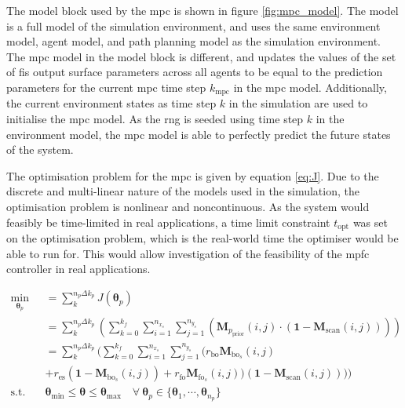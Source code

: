 \documentclass[conference]{IEEEtran}
\begin{document}
The model block used by the \gls{mpc} is shown in figure \ref{fig:mpc_model}.
The model is a full model of the simulation environment, and uses the same environment model, agent model, and path planning model as the simulation environment.
The \gls{mpc} model in the model block is different, and updates the values of the set of \gls{fis} output surface parameters across all agents to be equal to the prediction parameters for the current \gls{mpc} time step $k_{\text{mpc}}$ in the \gls{mpc} model.
Additionally, the current environment states as time step $k$ in the simulation are used to initialise the \gls{mpc} model.
As the \gls{rng} is seeded using time step $k$ in the environment model, the \gls{mpc} model is able to perfectly predict the future states of the system.

\begin{figure*}
    \centering
    
    \caption{\gls{mpc} model block diagram}
    \label{fig:mpc_model}
\end{figure*}

The optimisation problem for the \gls{mpc} is given by equation \ref{eq:J}.
Due to the discrete and multi-linear nature of the models used in the simulation, the optimisation problem is nonlinear and noncontinuous.
As the system would feasibly be time-limited in real applications, a time limit constraint $t_{\text{opt}}$ was set on the optimisation problem, which is the real-world time the optimiser would be able to run for.
This would allow investigation of the feasibility of the \gls{mpfc} controller in real applications.

\begin{equation} \label{eq:J}
    \begin{aligned}
        \min_{\bm{\theta}_{p}} 
        &= \sum_{k}^{n_{p} \Delta k_{p}} J (\bm{\theta}_{p})\\
        &= \sum_{k}^{n_{p} \Delta k_{p}} ( \sum_{k=0}^{k_{f}} \sum_{i=1}^{n_{x_{s}}} \sum_{j=1}^{n_{y_{s}}} ( \bm{M}_{p_{\text{prior}}}(i,j) \cdot (\bm{1} - \bm{M}_{\text{scan}}(i,j))) ) \\
        &= \sum_{k}^{n_{p} \Delta k_{p}} ( \sum_{k=0}^{k_{f}} \sum_{i=1}^{n_{x_{s}}} \sum_{j=1}^{n_{y_{s}}} ( r_{\text{bo}} \bm{M}_{\text{bo}_{s}}(i,j) \\
        & + r_{\text{es}} (\bm{1} - \bm{M}_{\text{bo}_{s}}(i,j)) + r_{\text{fo}} \bm{M}_{\text{fo}_{s}}(i,j)) (\bm{1} - \bm{M}_{\text{scan}}(i,j))) ) \\
        \textrm{s.t.} \quad & \bm{\theta}_{\min} \leq \bm{\theta} \leq \bm{\theta}_{\max} \quad \forall ~ \bm{\theta}_{p} \in \{ \bm{\theta}_{1}, \cdots, \bm{\theta}_{n_{p}} \} \\
    \end{aligned}
\end{equation}
\end{document}
